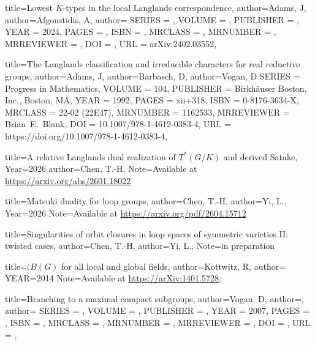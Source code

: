 \documentclass[12pt]{amsart}
\theoremstyle{remark}
\begin{document}
\begin{bibdiv}
\begin{biblist}

{
	title={Lowest $K$-types in the local Langlands correspondence}, 
	author={Adams, J},
    author={Afgoustidis, A},
    author={}
    SERIES = {},
    VOLUME = {},
 PUBLISHER = {},
      YEAR = {2024},
     PAGES = {},
      ISBN = {},
   MRCLASS = {},
  MRNUMBER = {},
MRREVIEWER = {},
       DOI = {},
       URL = {arXiv:2402.03552},
}

{
	title={The Langlands classification
and irreducible characters for real reductive groups}, 
	author={Adams, J},
    author={Barbasch, D},
    author={Vogan, D}
    SERIES = {Progress in Mathematics},
    VOLUME = {104},
 PUBLISHER = {Birkh\"auser Boston, Inc., Boston, MA},
      YEAR = {1992},
     PAGES = {xii+318},
      ISBN = {0-8176-3634-X},
   MRCLASS = {22-02 (22E47)},
  MRNUMBER = {1162533},
MRREVIEWER = {Brian\ E.\ Blank},
       DOI = {10.1007/978-1-4612-0383-4},
       URL = {https://doi.org/10.1007/978-1-4612-0383-4},
}






{
	title={A relative Langlands dual realization of $T^*(G/K)$ and derived Satake}, 
    Year={2026}
	author={Chen, T.-H},
    Note={Available at \url{https://arxiv.org/abs/2601.18022}}
}







{
	title={Matsuki duality for loop groups}, 
	author={Chen, T.-H},
    author={Yi, L.},
    Year={2026}
    Note={Available at \url{https://arxiv.org/pdf/2604.15712}}
  
}

{
	title={Singularities of orbit closures in loop spaces of symmetric varieties II: twisted cases}, 
	author={Chen, T.-H},
    author={Yi, L.},
   Note={in preparation}
  
}


{
	title={$(B(G)$ for all local and global fields}, 
	author={Kottwitz, R},
    author={}
    YEAR={2014}
	Note={Available at \url{https://arXiv:1401.5728}},
}


{
	title={Branching to a maximal compact subgroups}, 
	author={Vogan, D},
    author={},
    author={}
    SERIES = {},
    VOLUME = {},
 PUBLISHER = {},
      YEAR = {2007},
     PAGES = {},
      ISBN = {},
   MRCLASS = {},
  MRNUMBER = {},
MRREVIEWER = {},
       DOI = {},
       URL = {},
}

\end{biblist}
\end{bibdiv} 

	
\end{document}
